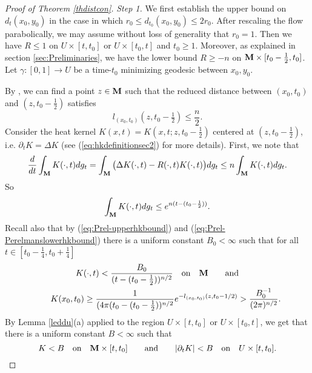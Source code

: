 \documentclass[11pt]{amsart}
\numberwithin{equation}{section}
\def\M{{\bf M}}
\numberwithin{equation}{section}
\begin{document}
\begin{proof}[Proof of Theorem \ref{thdistcon}]
\textit{Step 1.}
We first establish the upper bound on $d_t (x_0, y_0)$ in the case in which $r_0 \leq d_{t_0}(x_0, y_0) \leq 2 r_0$.
After rescaling the flow parabolically, we may assume without loss of generality that $r_0 = 1$.
Then we have $R \leq 1$ on $U \times [t, t_0]$ or $U \times [t_0, t]$ and $t_0 \geq 1$.
Moreover, as explained in section \ref{sec:Preliminaries}, we have the lower bound $R \geq -n$ on $\M \times [t_0 - \tfrac12, t_0]$.
Let $\gamma  : [0,1] \to U$ be a time-$t_0$ minimizing geodesic between $x_0, y_0$.

By \cite[end of 7.1]{P:1}, we can find a point $z \in \M$ such that the reduced distance between $(x_0, t_0)$ and $(z, t_0 - \tfrac12)$ satisfies
\[ l_{(x_0, t_0)} (z, t_0 - \tfrac12 ) \leq  \frac{n}2. \]
Consider the heat kernel $K(x,t) = K(x,t; z, t_0 - \frac12)$ centered at $(z, t_0- \frac12)$, i.e. $\partial_t K = \Delta K$ (see (\ref{eq:hkdefinitionsec2}) for more details).
First, we note that
\[ \frac{d}{dt} \int_{\M} K(\cdot, t) dg_t = \int_{\M} \big( \Delta K (\cdot, t) - R(\cdot, t) K (\cdot, t) \big) dg_t \leq n \int_{\M} K(\cdot, t) dg_t. \]
So
\begin{equation} \label{eq:L1boundk}
 \int_{\M} K(\cdot, t) dg_t \leq e^{n (t - (t_0 - \frac12))}.
\end{equation}
Recall also that by (\ref{eq:Prel-upperhkbound}) and (\ref{eq:Prel-Perelmanslowerhkbound}) there is a uniform constant $B_0 < \infty$ such that for all $t \in [t_0 - \frac14, t_0 + \frac14]$
\begin{multline} \label{eq:lowerbound}
 K(\cdot, t) < \frac{B_0}{(t-(t_0 - \frac12))^{n/2}} \quad \text{on} \quad \M \qquad \text{and} \\ \qquad
K(x_0, t_0) \geq \frac{1}{(4\pi (t_0 - (t_0 - \tfrac12))^{n/2}} e^{- l_{(x_0, t_0)} (z, t_0 - 1/2)} >  \frac{B_0^{-1}}{(2\pi)^{n/2}}.
\end{multline}
By Lemma \ref{leddu}(a) applied to the region $U \times [t, t_0]$ or $U \times [t_0, t]$, we get that there is a uniform constant $B < \infty$ such that
\begin{equation} \label{eq:nabkdtk2bound}
 K < B \quad \text{on} \quad \M \times [t, t_0] \qquad \text{and} \qquad |\partial_t K| < B \quad \text{on} \quad U \times [t, t_0 ].
\end{equation}


\end{proof}
\end{document}
